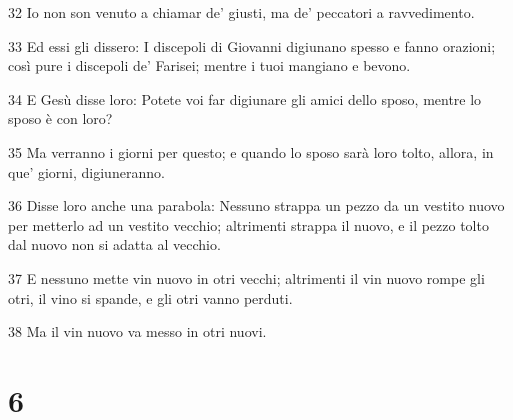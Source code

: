 \par 32 Io non son venuto a chiamar de' giusti, ma de' peccatori a ravvedimento.
\par 33 Ed essi gli dissero: I discepoli di Giovanni digiunano spesso e fanno orazioni; così pure i discepoli de' Farisei; mentre i tuoi mangiano e bevono.
\par 34 E Gesù disse loro: Potete voi far digiunare gli amici dello sposo, mentre lo sposo è con loro?
\par 35 Ma verranno i giorni per questo; e quando lo sposo sarà loro tolto, allora, in que' giorni, digiuneranno.
\par 36 Disse loro anche una parabola: Nessuno strappa un pezzo da un vestito nuovo per metterlo ad un vestito vecchio; altrimenti strappa il nuovo, e il pezzo tolto dal nuovo non si adatta al vecchio.
\par 37 E nessuno mette vin nuovo in otri vecchi; altrimenti il vin nuovo rompe gli otri, il vino si spande, e gli otri vanno perduti.
\par 38 Ma il vin nuovo va messo in otri nuovi.

\chapter{6}

